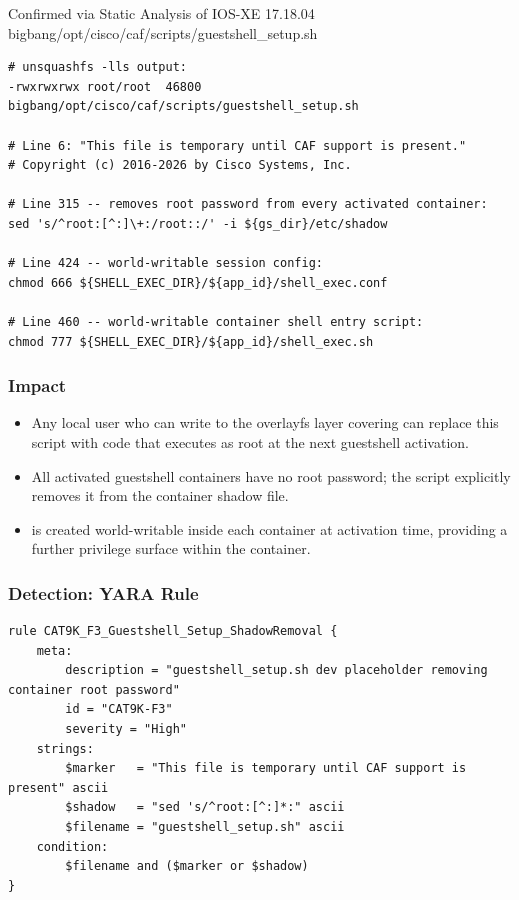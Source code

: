 \documentclass[11pt,a4paper]{article}
\begin{document}
\begin{pocbox}{Confirmed via Static Analysis of IOS-XE 17.18.04 bigbang/opt/cisco/caf/scripts/guestshell\_setup.sh}
\begin{lstlisting}[style=bash]
# unsquashfs -lls output:
-rwxrwxrwx root/root  46800 bigbang/opt/cisco/caf/scripts/guestshell_setup.sh

# Line 6: "This file is temporary until CAF support is present."
# Copyright (c) 2016-2026 by Cisco Systems, Inc.

# Line 315 -- removes root password from every activated container:
sed 's/^root:[^:]\+:/root::/' -i ${gs_dir}/etc/shadow

# Line 424 -- world-writable session config:
chmod 666 ${SHELL_EXEC_DIR}/${app_id}/shell_exec.conf

# Line 460 -- world-writable container shell entry script:
chmod 777 ${SHELL_EXEC_DIR}/${app_id}/shell_exec.sh
\end{lstlisting}
\end{pocbox}

\subsubsection{Impact}

\begin{itemize}[nosep]
  \item Any local user who can write to the overlayfs layer covering
     can replace this script with code that executes
    as root at the next guestshell activation.
  \item All activated guestshell containers have no root password; the script
    explicitly removes it from the container shadow file.
  \item {} is created world-writable inside each container at
    activation time, providing a further privilege surface within the container.
\end{itemize}

\subsubsection{Detection: YARA Rule}

\begin{lstlisting}[style=yara]
rule CAT9K_F3_Guestshell_Setup_ShadowRemoval {
    meta:
        description = "guestshell_setup.sh dev placeholder removing container root password"
        id = "CAT9K-F3"
        severity = "High"
    strings:
        $marker   = "This file is temporary until CAF support is present" ascii
        $shadow   = "sed 's/^root:[^:]*:" ascii
        $filename = "guestshell_setup.sh" ascii
    condition:
        $filename and ($marker or $shadow)
}
\end{lstlisting}
\end{document}
